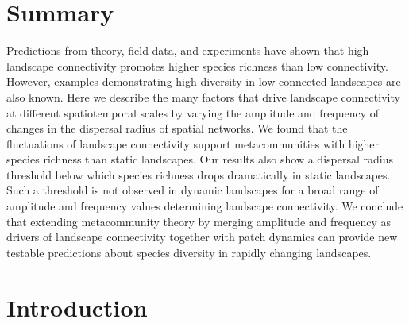 \documentclass[a4paper,12pt]{article}
\begin{document}

\newpage
\section*{Summary}
Predictions from theory, field data, and experiments have shown that high landscape connectivity promotes higher species richness than low connectivity. However, examples demonstrating high diversity in low connected landscapes are also known. Here we describe the many factors that drive landscape connectivity at different spatiotemporal scales by varying the amplitude and frequency of changes in the dispersal radius of spatial networks. We found that the fluctuations of landscape connectivity support metacommunities with higher species richness than static landscapes. Our results also show a dispersal radius threshold below which species richness drops dramatically in static landscapes. Such a threshold is not observed in dynamic landscapes for a broad range of amplitude and frequency values determining landscape connectivity. We conclude that extending metacommunity theory by merging amplitude and frequency as drivers of landscape connectivity together with patch dynamics can provide new testable predictions about species diversity in rapidly changing landscapes.    
\newpage
\section*{Introduction}
    
\end{document}
